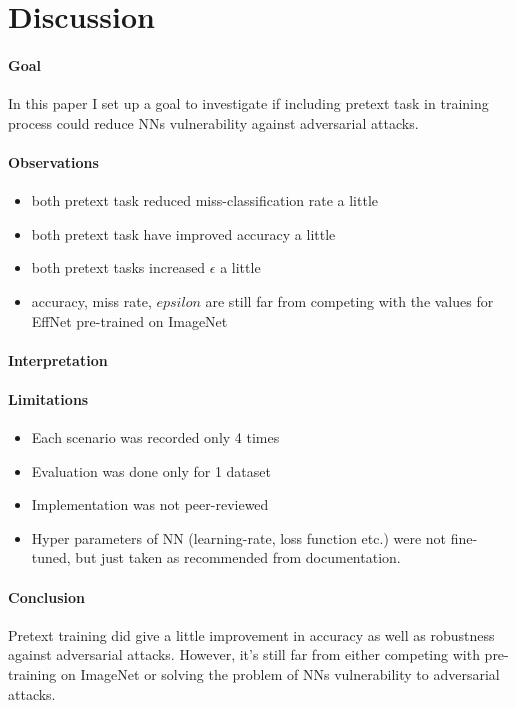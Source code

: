 \section{Discussion}

\paragraph{Goal}
In this paper I set up a goal to investigate if including pretext task in training process could reduce NNs
vulnerability against adversarial attacks.

\paragraph{Observations}
\begin{itemize}
    \item both pretext task reduced miss-classification rate a little
    \item both pretext task have improved accuracy a little
    \item both pretext tasks increased $\epsilon$ a little
    \item accuracy, miss rate, $epsilon$ are still far from competing with the values for EffNet pre-trained on ImageNet
\end{itemize}

\paragraph{Interpretation}

\paragraph{Limitations}
\begin{itemize}
    \item Each scenario was recorded only 4 times
    \item Evaluation was done only for 1 dataset
    \item Implementation was not peer-reviewed
    \item Hyper parameters of NN (learning-rate, loss function etc.) were not fine-tuned,
    but just taken as recommended from documentation.
\end{itemize}

\paragraph{Conclusion}
Pretext training did give a little improvement in accuracy as well as robustness against adversarial attacks.
However, it's still far from either competing with pre-training on ImageNet or solving the problem of NNs vulnerability
to adversarial attacks.

